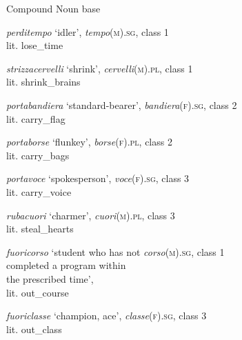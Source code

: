 \documentclass[output=paper,colorlinks,citecolor=brown]{langscibook}
\begin{document}
\begin{exe}
	\ex \label{10ex19} Compound \hspace*{4.35cm} Noun base 
	\begin{xlist}
		\ex 
		\emph{perditempo} ‘idler’, \hspace*{2.7cm} \textit{tempo}\textsc{(m).sg}, class 1 \\ 
		lit. lose\_time
		
		\ex \label{10ex19b}
		\emph{strizzacervelli} ‘shrink’, \hspace*{2cm} \textit{cervelli}\textsc{(m).pl}, class 1 \\
		lit. shrink\_brains
		
		\ex 
		\emph{portabandiera} ‘standard-bearer’, \hspace*{0.5cm} \textit{bandiera}\textsc{(f).sg}, class 2 \\
		lit. carry\_flag
		
		\ex \label{10ex19d}
		\emph{portaborse} ‘flunkey’,  \hspace*{2.32cm} \textit{borse}\textsc{(f).pl}, class 2 \\
		lit. carry\_bags
		
		\ex 
		\emph{portavoce} ‘spokesperson’, \hspace*{1.5cm} \textit{voce}\textsc{(f).sg}, class 3 \\
		lit. carry\_voice
		
		\ex \label{10ex19f}
		\emph{rubacuori} ‘charmer’, \hspace*{2.35cm} \textit{cuori}\textsc{(m).pl}, class 3 \\
		lit. steal\_hearts
		
		\ex 
		\emph{fuoricorso} ‘student who has not \hspace*{0.6cm} \textit{corso}\textsc{(m).sg}, class 1 \\
		completed a program within \\
		the prescribed time’, \\
		lit. out\_course
		
		\ex 
		\emph{fuoriclasse} ‘champion, ace’,  \hspace*{1.3cm} \textit{classe}\textsc{(f).sg}, class 3 \\
		lit. out\_class
	\end{xlist}
\end{exe}
\end{document}
